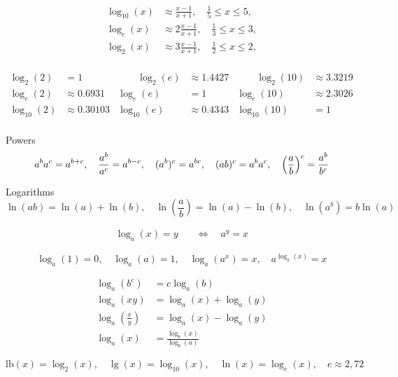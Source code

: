 \documentclass[12pt]{article}
\begin{document}
\begin{equation*}
\begin{split}
\log_{10}(x)&\approx\frac{x-1}{x+1},\quad\frac{1}{5}\leq x\leq 5,\\
\log_{e}(x)&\approx 2\frac{x-1}{x+1},\quad\frac{1}{3}\leq x\leq 3,\\
\log_{2}(x)&\approx 3\frac{x-1}{x+1},\quad\frac{1}{2}\leq x\leq 2,\\
\end{split}
\end{equation*}

\(
\begin{array}{rlrlrl}
\log_2(2)&=1 &\qquad \log_2(e)&\approx 1.4427 &\qquad \log_2(10)&\approx 3.3219\\
\log_e(2)&\approx 0.6931 & \log_e(e)&=1 & \log_e(10)&\approx 2.3026\\
\log_{10}(2)&\approx 0.30103 & \log_{10}(e)&\approx 0.4343 & \log_{10}(10)&=1\\
\end{array}
\)
\vspace{5mm}

Powers
$$
a^ba^c=a^{b+c},\quad 
\frac{a^b}{a^c}=a^{b-c},\quad 
(a^b)^c=a^{bc},\quad 
(ab)^c=a^ba^c,\quad 
\left(\frac{a}{b}\right)^c=\frac{a^b}{b^c}
$$

Logarithms
$$
\ln(ab)=\ln(a)+\ln(b),\quad
\ln(\frac{a}{b})=\ln(a)-\ln(b),\quad
\ln(a^b)=b\ln(a)
$$


\begin{equation*}
\begin{split}
\log_a(x)=y\quad&\Leftrightarrow\quad a^y=x
\end{split}
\end{equation*}


$$
\log_a(1)=0,\quad
\log_a(a)=1,\quad
\log_a(a^x)=x,\quad
a^{\log_a(x)}=x
$$

\begin{equation*}
\begin{split}
\log_a(b^c)&=c\log_a(b)\\
\log_a(xy)&=\log_a(x)+\log_a(y)\\
\log_a\left(\frac{x}{y}\right)
&=\log_a(x)-\log_a(y)\\
\log_a(x)&=\frac{\log_b(x)}{\log_b(a)}
\end{split}
\end{equation*}

$$
\textrm{lb}(x)=\log_2(x),\quad
\lg(x)=\log_{10}(x),\quad
\ln(x)=\log_e(x),\quad
e\approx 2,72
$$
\end{document}
